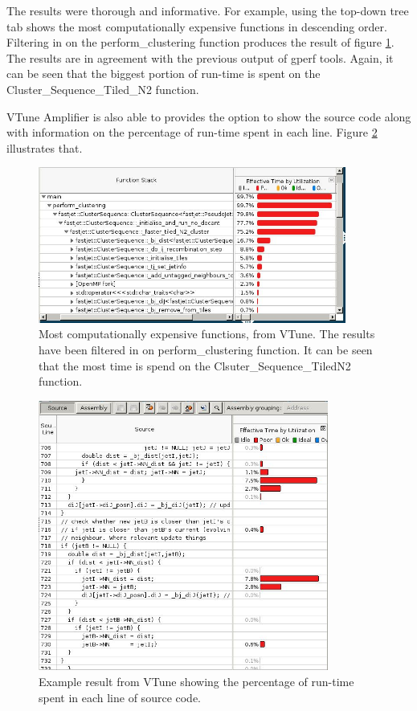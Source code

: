 The results were thorough and informative. For example, using the top-down tree tab shows the most computationally expensive functions in descending order. Filtering in on the perform\_clustering function produces the result of figure \ref{fig:vtune1}. The results are in agreement with the previous output of gperf tools. Again, it can be seen that the biggest portion of run-time is spent on the Cluster\_Sequence\_Tiled\_N2 function.

VTune Amplifier is also able to provides the option to show the source code along with information on the percentage of run-time spent in each line. Figure \ref{fig:vtune2} illustrates that. 

\begin{figure}[H]
    \centering
    \includegraphics[width=0.9\textwidth]{images/vtune1.JPG}
    \caption{Most computationally expensive functions, from VTune. The results have been filtered in on perform\_clustering function. It can be seen that the most time is spend on the Clsuter\_Sequence\_TiledN2 function.}
    \label{fig:vtune1}
\end{figure}

\begin{figure}[H]
    \centering
    \includegraphics[width=0.85\textwidth]{images/vtune2.JPG}
    \caption{Example result from VTune showing the percentage of run-time spent in each line of source code.}
    \label{fig:vtune2}
\end{figure}

